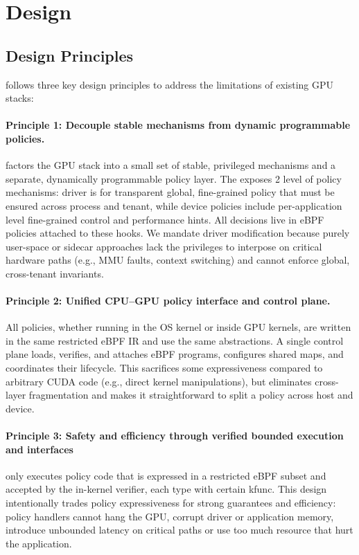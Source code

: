 \section{\sys Design}

\subsection{Design Principles}

\sys follows three key design principles to address the limitations of existing GPU stacks:

\paragraph{Principle 1: Decouple stable mechanisms from dynamic programmable policies.}
\sys factors the GPU stack into a small set of stable, privileged mechanisms and a separate, dynamically programmable policy layer. The \sysdriver exposes 2 level of policy mechanisms: driver is for transparent global, fine-grained policy that must be ensured across process and tenant, while device policies include per-application level fine-grained control and performance hints. All decisions live in eBPF policies attached to these hooks. We mandate driver modification because purely user-space or sidecar approaches lack the privileges to interpose on critical hardware paths (e.g., MMU faults, context switching) and cannot enforce global, cross-tenant invariants.

\paragraph{Principle 2: Unified CPU--GPU policy interface and control plane.}
All \sys policies, whether running in the OS kernel or inside GPU kernels, are written in the same restricted eBPF IR and use the same abstractions. A single control plane loads, verifies, and attaches eBPF programs, configures shared maps, and coordinates their lifecycle. This sacrifices some expressiveness compared to arbitrary CUDA code (e.g., direct kernel manipulations), but eliminates cross-layer fragmentation and makes it straightforward to split a policy across host and device.

\paragraph{Principle 3: Safety and efficiency through verified bounded execution and interfaces}
\sys only executes policy code that is expressed in a restricted eBPF subset and accepted by the in-kernel verifier, each type with certain kfunc. This design intentionally trades policy expressiveness for strong guarantees and efficiency: policy handlers cannot hang the GPU, corrupt driver or application memory, introduce unbounded latency on critical paths or use too much resource that hurt the application.


